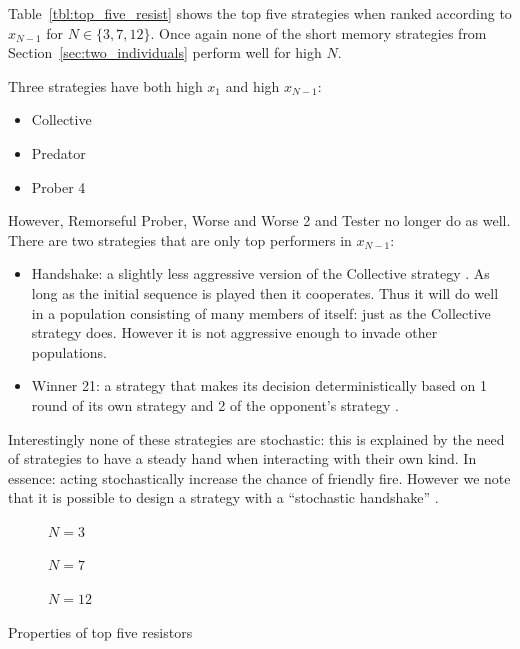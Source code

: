 \documentclass{article}
\begin{document}
Table~\ref{tbl:top_five_resist} shows the top five strategies when ranked
according to \(x_{N-1}\) for \(N\in\{3, 7, 12\}\).
Once again none of the short memory strategies from
Section~\ref{sec:two_individuals} perform well for high \(N\).

Three strategies have both high \(x_1\) and high \(x_{N-1}\):

\begin{itemize}
    \item Collective
    \item Predator
    \item Prober 4
\end{itemize}

However, Remorseful Prober, Worse and Worse 2 and Tester no longer do as well.
There are two strategies that are only top performers in \(x_{N-1}\):

\begin{itemize}
    \item Handshake: a slightly less aggressive version of the Collective
        strategy \cite{robson1989}. As long as the initial sequence is played
        then it cooperates. Thus it will do well in a population consisting of
        many members of itself: just as the Collective strategy does. However it
        is not aggressive enough to invade other populations.
    \item Winner 21: a strategy that makes its decision deterministically based
        on 1 round of its own strategy and 2 of the opponent's strategy
        \cite{Mathieu2015}.
\end{itemize}

Interestingly none of these strategies are stochastic: this is explained by
the need of strategies to have a steady hand when interacting with their own
kind. In essence: acting stochastically increase the chance of friendly fire.
However we note that it is possible to design a strategy with a ``stochastic
handshake'' \cite{Lee2015}.


\begin{table}[!hbtp]
    \begin{subfigure}[t]{\textwidth}
        \centering
        
        \caption{\(N=3\)}
    \end{subfigure}
    \begin{subfigure}[t]{\textwidth}
        \centering
        
        \caption{\(N=7\)}
    \end{subfigure}
    \begin{subfigure}[t]{\textwidth}
        \centering
        
        \caption{\(N=12\)}
    \end{subfigure}
    \caption{Properties of top five resistors}
    \label{tbl:top_five_resist}
\end{table}
\end{document}
